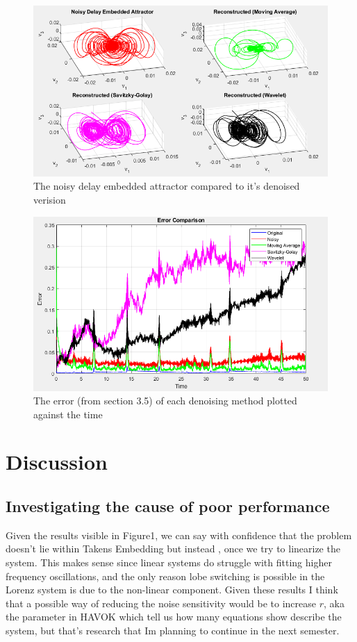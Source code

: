 \documentclass[11pt]{article}
\begin{document}
	\begin{figure}
		\centering
		\includegraphics[width=0.7\linewidth]{Figure4}
		\caption{The noisy delay embedded attractor compared to it's denoised verision}
		\label{fig:figure4}
	\end{figure}
	
	\begin{figure}
		\centering
		\includegraphics[width=0.7\linewidth]{Figure5}
		\caption{The error (from section 3.5) of each denoising method plotted against the time}
		\label{fig:figure5}
	\end{figure}
	
	
	\section{Discussion}
	
	\subsection{Investigating the cause of poor performance}
	Given the results visible in Figure1, we can say with confidence that the problem doesn't lie within Takens Embedding but instead , once we try to linearize the system. This makes sense since linear systems do struggle with fitting higher frequency oscillations, and the only reason lobe switching is possible in the Lorenz system is due to the non-linear component. Given these results I think that a possible way of reducing the noise sensitivity would be to increase \(r\), aka the parameter in HAVOK which tell us how many equations show describe the system, but that's research that Im planning to continue in the next semester.
	
\end{document}
